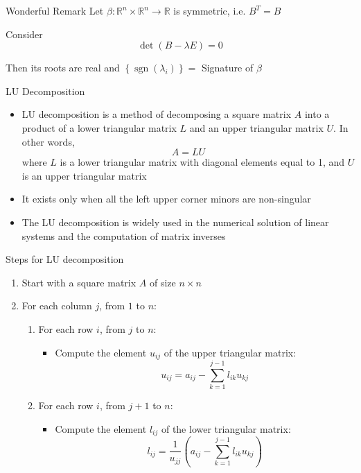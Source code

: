 \documentclass[fullscreen=true, bookmarks=true, hyperref={pdfencoding=unicode}]{beamer}
\begin{document}
\begin{frame}
  \begin{block}{Wonderful Remark}
    Let $\beta: \mathbb{R}^n \times \mathbb{R}^n \to \mathbb{R}$ is symmetric, i.e. $B^T = B$

    Consider $$\det (B - \lambda E) = 0$$
    
    Then its roots are real and $\left\{\operatorname{sgn}(\lambda_i)\right\} = $ Signature of $\beta$
  \end{block}
\end{frame}


\begin{frame}{LU Decomposition}
  \begin{itemize}
    \item LU decomposition is a method of decomposing a square matrix $A$ 
    into a product of a lower triangular matrix $L$ and 
    an upper triangular matrix $U$. 
    In other words,
    \[
    A = LU
    \]
    where $L$ is a lower triangular matrix with diagonal elements equal to 1, 
    and $U$ is an upper triangular matrix
  
    \pause\item It exists only when all the left upper corner minors 
    are non-singular
    
    \pause\item The LU decomposition is widely used in the numerical solution of 
    linear systems and the computation of matrix inverses
  \end{itemize}
\end{frame}


\begin{frame}{Steps for LU decomposition}
  \begin{enumerate}
    \item Start with a square matrix $A$ of size $n \times n$
    \item For each column $j$, from $1$ to $n$:
    \begin{enumerate}
      \item For each row $i$, from $j$ to $n$:
      \begin{itemize}
        \item Compute the element $u_{ij}$ of the upper triangular matrix:
        \[
        u_{ij} = a_{ij} - \sum_{k=1}^{j-1} l_{ik} u_{kj}
        \]
      \end{itemize}
      \item For each row $i$, from $j+1$ to $n$:
      \begin{itemize}
        \item Compute the element $l_{ij}$ of the lower triangular matrix:
        \[
        l_{ij} = \frac{1}{u_{jj}} \left( a_{ij} - \sum_{k=1}^{j-1} l_{ik} u_{kj} \right)
        \]
      \end{itemize}
    \end{enumerate}
  \end{enumerate}  
\end{frame}
\end{document}
